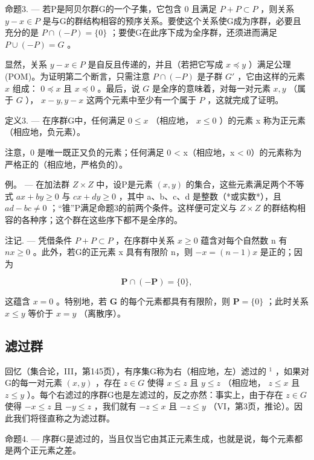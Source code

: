 命题3. --- 若P是阿贝尔群G的一个子集，它包含 0 且满足 \(P + P \subset P\) ，则关系 \(y - x \in P\) 是与G的群结构相容的预序关系。要使这个关系使G成为序群，必要且充分的是 \(P \cap (-P) = \{0\}\) ；要使G在此序下成为全序群，还须进而满足 \(P \cup (-P) = G\) 。

显然，关系 \(y - x \in P\) 是自反且传递的，并且（若把它写成 \(x \preccurlyeq y\) ）满足公理(POM)。为证明第二个断言，只需注意 \(P \cap (-P)\) 是子群 \(G'\) ，它由这样的元素 \(x\) 组成： \(0 \preccurlyeq x\) 且 \(x \preccurlyeq 0\) 。最后，说 \(G\) 是全序的意味着，对每一对元素 \(x, y\) （属于 \(G\) ）， \(x - y, y - x\) 这两个元素中至少有一个属于 \(P\) ，这就完成了证明。

定义3. --- 在序群G中，任何满足 \(0 \leqslant x\) （相应地， \(x \leqslant 0\) ）的元素 x 称为正元素（相应地，负元素）。

注意，0 是唯一既正又负的元素；任何满足 0 \textless{} x（相应地，x \textless{} 0）的元素称为严格正的（相应地，严格负的）。

例。 --- 在加法群 \(Z \times Z\) 中，设P是元素 \((x, y)\) 的集合，这些元素满足两个不等式 \(ax + by \geqslant 0\) 与 \(cx + dy \geqslant 0\) ，其中 a、b、c、d 是整数（*或实数*），且 \(ad - bc \neq 0\) ；“锥”P满足命题3的前两个条件。这样便可定义与 \(Z \times Z\) 的群结构相容的各种序；这个群在这些序下都不是全序的。

注记. --- 凭借条件 \(P + P \subset P\) ，在序群中关系 \(x \geqslant 0\) 蕴含对每个自然数 n 有 \(nx \geqslant 0\) 。此外，若G的正元素 x 具有有限阶 n，则 \(-x = (n - 1)x\) 是正的；因为

\[
\mathbf {P} \cap (- \mathbf {P}) = \{0 \},
\]

这蕴含 \(x = 0\) 。特别地，若 \(\mathbf{G}\) 的每个元素都具有有限阶，则 \(\mathbf{P} = \{0\}\) ；此时关系 \(x \leqslant y\) 等价于 \(x = y\) （离散序）。

\subsection{滤过群}

回忆（集合论，III，第145页），有序集G称为右（相应地，左）滤过的 \(^{1}\) ，如果对G的每一对元素 \((x, y)\) ，存在 \(z \in G\) 使得 \(x \leqslant z\) 且 \(y \leqslant z\) （相应地， \(z \leqslant x\) 且 \(z \leqslant y\) ）。每个右滤过的序群G也是左滤过的，反之亦然：事实上，由于存在 \(z \in G\) 使得 \(-x \leqslant z\) 且 \(-y \leqslant z\) ，我们就有 \(-z \leqslant x\) 且 \(-z \leqslant y\) （VI，第3页，推论）。因此我们将径直称之为滤过群。

命题4. --- 序群G是滤过的，当且仅当它由其正元素生成，也就是说，每个元素都是两个正元素之差。

